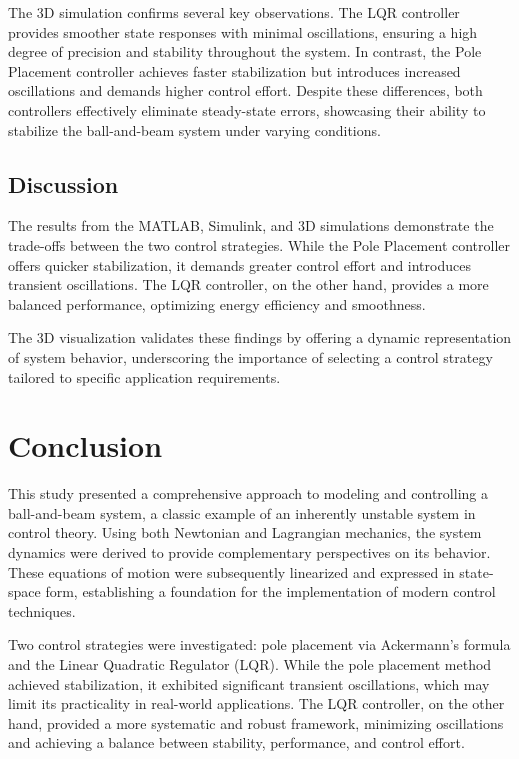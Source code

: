 \documentclass[conference]{IEEEtran}
\begin{document}
The 3D simulation confirms several key observations. The LQR controller provides smoother state responses with minimal oscillations, ensuring a high degree of precision and stability throughout the system. In contrast, the Pole Placement controller achieves faster stabilization but introduces increased oscillations and demands higher control effort. Despite these differences, both controllers effectively eliminate steady-state errors, showcasing their ability to stabilize the ball-and-beam system under varying conditions.

\subsection{Discussion}
The results from the MATLAB, Simulink, and 3D simulations demonstrate the trade-offs between the two control strategies. While the Pole Placement controller offers quicker stabilization, it demands greater control effort and introduces transient oscillations. The LQR controller, on the other hand, provides a more balanced performance, optimizing energy efficiency and smoothness. 

The 3D visualization validates these findings by offering a dynamic representation of system behavior, underscoring the importance of selecting a control strategy tailored to specific application requirements.


\section{Conclusion}
\label{sec:conclusion}

This study presented a comprehensive approach to modeling and controlling a ball-and-beam system, a classic example of an inherently unstable system in control theory. Using both Newtonian and Lagrangian mechanics, the system dynamics were derived to provide complementary perspectives on its behavior. These equations of motion were subsequently linearized and expressed in state-space form, establishing a foundation for the implementation of modern control techniques.

Two control strategies were investigated: pole placement via Ackermann’s formula and the Linear Quadratic Regulator (LQR). While the pole placement method achieved stabilization, it exhibited significant transient oscillations, which may limit its practicality in real-world applications. The LQR controller, on the other hand, provided a more systematic and robust framework, minimizing oscillations and achieving a balance between stability, performance, and control effort.
\end{document}

